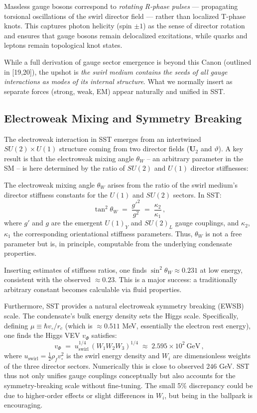 \documentclass[reprint,aps,onecolumn,nofootinbib]{revtex4-2}
\begin{document}
        \noindent
        Massless gauge bosons correspond to \emph{rotating R-phase pulses} — propagating torsional oscillations of the swirl director field — rather than localized T-phase knots.
        This captures photon helicity (spin $\pm 1$) as the sense of director rotation and ensures that gauge bosons remain delocalized excitations, while quarks and leptons remain topological knot states.



	While a full derivation of gauge sector emergence is beyond this Canon (outlined in [19,20]), the upshot is \emph{the swirl medium contains the seeds of all gauge interactions as modes of its internal structure}. What we normally insert as separate forces (strong, weak, EM) appear naturally and unified in SST.

	\subsection*{Electroweak Mixing and Symmetry Breaking}
	The electroweak interaction in SST emerges from an intertwined $SU(2)\times U(1)$ structure coming from two director fields ($\mathbf{U}_2$ and $\vartheta$). A key result is that the electroweak mixing angle $\theta_W$ – an arbitrary parameter in the SM – is here determined by the ratio of $SU(2)$ and $U(1)$ director stiffnesses:

	\begin{tcolorbox}[title=Theorem 6.2: Weak Mixing Angle from First Principles]
		The electroweak mixing angle $\theta_W$ arises from the ratio of the swirl medium’s director stiffness constants for the $U(1)$ and $SU(2)$ sectors. In SST:
		\[
			\tan^2 \theta_W \;=\; \frac{g'^2}{g^2} \;=\; \frac{\kappa_2}{\kappa_1}\,,
		\]
		where $g'$ and $g$ are the emergent $U(1)_Y$ and $SU(2)_L$ gauge couplings, and $\kappa_2$, $\kappa_1$ the corresponding orientational stiffness parameters. Thus, $\theta_W$ is not a free parameter but is, in principle, computable from the underlying condensate properties.
	\end{tcolorbox}

	\noindent Inserting estimates of stiffness ratios, one finds $\sin^2\theta_W \approx 0.231$ at low energy, consistent with the observed $\approx0.23$. This is a major success: a traditionally arbitrary constant becomes calculable via fluid properties.

	Furthermore, SST provides a natural electroweak symmetry breaking (EWSB) scale. The condensate’s bulk energy density sets the Higgs scale. Specifically, defining $\mu \equiv \hbar v_{\circ}/r_c$ (which is $\approx0.511$ MeV, essentially the electron rest energy), one finds the Higgs VEV $v_{\Phi}$ satisfies:
	\[
		v_{\Phi} \;=\; u_{\text{swirl}}^{1/4}\,(W_1 W_2 W_3)^{1/4} \;\approx\; 2.595\times 10^2~\text{GeV}\,,
	\]
	where $u_{\text{swirl}} = \frac{1}{2}\rho_f v_{\circ}^2$ is the swirl energy density and $W_i$ are dimensionless weights of the three director sectors. Numerically this is close to observed $246$ GeV. SST thus not only unifies gauge couplings conceptually but also accounts for the symmetry-breaking scale without fine-tuning. The small 5\% discrepancy could be due to higher-order effects or slight differences in $W_i$, but being in the ballpark is encouraging.
\end{document}
